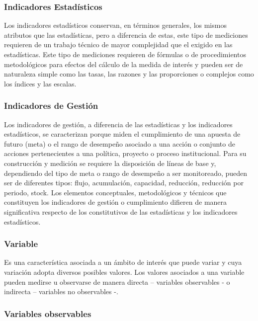 \documentclass[
]{book}
\begin{document}
\hypertarget{indicadores-estaduxedsticos}{%
\subsubsection{Indicadores Estadísticos}\label{indicadores-estaduxedsticos}}

Los indicadores estadísticos conservan, en términos generales, los mismos atributos que las estadísticas, pero a diferencia de estas, este tipo de mediciones requieren de un trabajo técnico de mayor complejidad que el exigido en las estadísticas. Este tipo de mediciones requieren de fórmulas o de procedimientos metodológicos para efectos del cálculo de la medida de interés y pueden ser de naturaleza simple como las tasas, las razones y las proporciones o complejos como los índices y las escalas.

\hypertarget{indicadores-de-gestiuxf3n}{%
\subsubsection{Indicadores de Gestión}\label{indicadores-de-gestiuxf3n}}

Los indicadores de gestión, a diferencia de las estadísticas y los indicadores estadísticos, se caracterizan porque miden el cumplimiento de una apuesta de futuro (meta) o el rango de desempeño asociado a una acción o conjunto de acciones pertenecientes a una política, proyecto o proceso institucional. Para su construcción y medición se requiere la disposición de líneas de base y, dependiendo del tipo de meta o rango de desempeño a ser monitoreado, pueden ser de diferentes tipos: flujo, acumulación, capacidad, reducción, reducción por periodo, stock. Los elementos conceptuales, metodológicos y técnicos que constituyen los indicadores de gestión o cumplimiento difieren de manera significativa respecto de los constitutivos de las estadísticas y los indicadores estadísticos.

\hypertarget{variable}{%
\subsubsection{Variable}\label{variable}}

Es una característica asociada a un ámbito de interés que puede variar y cuya variación adopta diversos posibles valores. Los valores asociados a una variable pueden medirse u observarse de manera directa -- variables observables - o indirecta -- variables no observables -.

\hypertarget{variables-observables}{%
\subsubsection{Variables observables}\label{variables-observables}}
\end{document}
